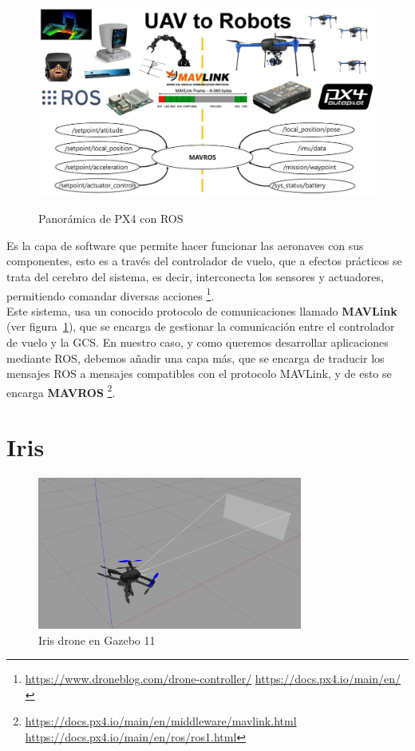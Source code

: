 \begin{figure} [tp]
	\begin{center}
	\includegraphics[height=7cm]{imagenes/cap3/7_px4_logo.jpeg}
	\end{center}
	\caption[Panorámica de PX4 con \ac{ROS}]{Panorámica de PX4 con \ac{ROS}}
	\label{fig:px4autopilot}
\end{figure}

Es la capa de software que permite hacer funcionar las aeronaves con sus componentes, esto es a través del controlador de vuelo, que a efectos prácticos se trata del cerebro del sistema, es decir, interconecta los sensores y actuadores, permitiendo comandar diversas acciones \footnote[14]{\url{https://www.droneblog.com/drone-controller/} \url{https://docs.px4.io/main/en/}}.\\

Este sistema, usa un conocido protocolo de comunicaciones llamado \textbf{MAVLink} (ver figura~\ref{fig:px4autopilot}), que se encarga de gestionar la comunicación entre el controlador de vuelo y la \ac{GCS}. En nuestro caso, y como queremos desarrollar aplicaciones mediante \ac{ROS}, debemos añadir una capa más, que se encarga de traducir los mensajes ROS a mensajes compatibles con el protocolo MAVLink, y de esto se encarga \textbf{MAVROS} \footnote[15]{\url{https://docs.px4.io/main/en/middleware/mavlink.html} \url{https://docs.px4.io/main/en/ros/ros1.html}}.\\

\section{Iris}
\label{sec:iris}

\begin{figure} [tp]
	\begin{center}
	\includegraphics[height=5cm]{imagenes/cap3/8_iris_drone.png}
	\end{center}
	\caption[Iris drone en Gazebo 11]{Iris drone en Gazebo 11}
	\label{fig:irisdrone}
\end{figure}

